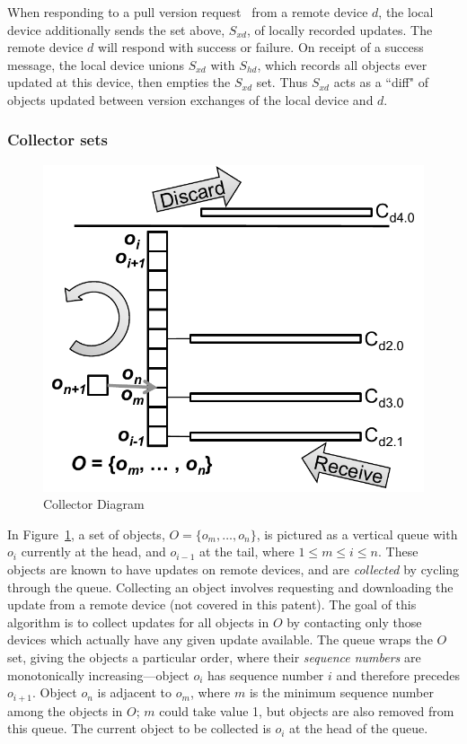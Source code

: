 When responding to a pull version request~\cite{wang:patent2012} from a remote
device $d$, the local device additionally sends the set above, $S_{xd}$, of
locally recorded updates. The remote device $d$ will respond with success or
failure. On receipt of a success message, the local device unions $S_{xd}$ with
$S_{hd}$, which records all objects ever updated at this device, then empties
the $S_{xd}$ set. Thus $S_{xd}$ acts as a ``diff" of objects updated between
version exchanges of the local device and $d$.

\subsubsection*{Collector sets}

\begin{figure}[t]
\centering
\includegraphics{figs/collector.pdf}
\caption{Collector Diagram}
\label{fig:collectorferris}
\end{figure}

In Figure~\ref{fig:collectorferris}, a set of objects, $O=\{o_m,\ldots,o_n\}$,
is pictured as a vertical queue with $o_i$ currently at the head, and $o_{i-1}$
at the tail, where $1 \leq m \leq i \leq n$. These objects are known to have
updates on remote devices, and are {\em collected} by cycling through the queue.
Collecting an object involves requesting and downloading the update from a
remote device (not covered in this patent). The goal of this algorithm is to
collect updates for all objects in $O$ by contacting only those devices which
actually have any given update available. The queue wraps the $O$ set, giving
the objects a particular order, where their {\em sequence numbers} are
monotonically increasing---object $o_i$ has sequence number $i$ and therefore
precedes $o_{i+1}$. Object $o_n$ is adjacent to $o_m$, where $m$ is the minimum
sequence number among the objects in $O$; $m$ could take value 1, but objects
are also removed from this queue. The current object to be collected is $o_i$ at
the head of the queue.

